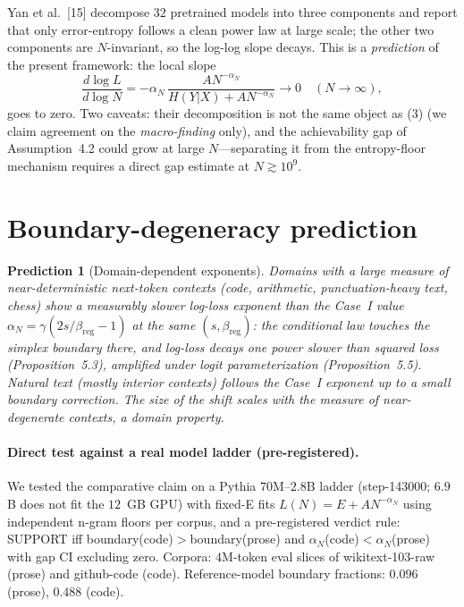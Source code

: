 \documentclass[12pt]{article}
\newtheorem{prediction}[theorem]{Prediction}
\theoremstyle{remark}
\begin{document}
Yan et al.~[15] decompose $32$ pretrained models into three
components and report that only error-entropy follows a clean power law at
large scale; the other two components are $N$-invariant, so the log-log slope
decays. This is a \emph{prediction} of the present framework: the local slope
\begin{equation}
\frac{d\log L}{d\log N}
  = -\alpha_N\,\frac{A N^{-\alpha_N}}{H(Y|X)+A N^{-\alpha_N}}
  \longrightarrow 0 \quad (N\to\infty),
  \label{eq:slope}
\end{equation}
goes to zero. Two caveats: their decomposition is not the same object as
(3) (we claim agreement on the \emph{macro-finding} only), and
the achievability gap of Assumption~4.2 could grow at large
$N$---separating it from the entropy-floor mechanism requires a direct gap
estimate at $N\gtrsim10^9$.

\section{Boundary-degeneracy prediction}
\label{sec:prediction}

\begin{prediction}[Domain-dependent exponents]
\label{pred:boundary}
Domains with a large measure of near-deterministic next-token contexts
(code, arithmetic, punctuation-heavy text, chess) show a measurably slower
log-loss exponent than the Case~I value $\alpha_N=\gamma(2s/\beta_{\mathrm{reg}}-1)$ at the same $(s,\beta_{\mathrm{reg}})$: the conditional law touches the
simplex boundary there, and log-loss decays one power slower than squared
loss (Proposition~5.3), amplified under logit
parameterization (Proposition~5.5). Natural text (mostly
interior contexts) follows the Case~I exponent up to a small boundary
correction. The size of the shift scales with the measure of
near-degenerate contexts, a domain property.
\end{prediction}

\paragraph{Direct test against a real model ladder (pre-registered).}
\label{par:prediction-test}
We tested the comparative claim on a Pythia $70$M--$2.8$B ladder
(step-143000; $6.9$B does not fit the $12$~GB GPU) with fixed-E fits
$L(N)=E+AN^{-\alpha_N}$ using independent n-gram floors per corpus, and a
pre-registered verdict rule: SUPPORT iff boundary(code)$>$boundary(prose) and
$\alpha_N$(code)$<\alpha_N$(prose) with gap CI excluding zero. Corpora: $4$M-token
eval slices of wikitext-103-raw (prose) and github-code (code). Reference-model
boundary fractions: $0.096$ (prose), $0.488$ (code).
\end{document}
